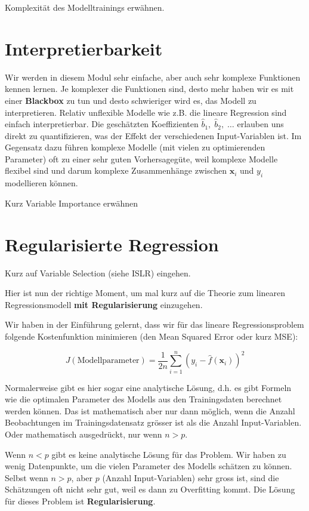 \documentclass[
]{book}
\begin{document}
Komplexität des Modelltrainings erwähnen.

\hypertarget{interpretierbarkeit}{%
\section{Interpretierbarkeit}\label{interpretierbarkeit}}

Wir werden in diesem Modul sehr einfache, aber auch sehr komplexe Funktionen kennen lernen. Je komplexer die Funktionen sind, desto mehr haben wir es mit einer \textbf{Blackbox} zu tun und desto schwieriger wird es, das Modell zu interpretieren. Relativ unflexible Modelle wie z.B. die lineare Regression sind einfach interpretierbar. Die geschätzten Koeffizienten \(\hat{b}_1,\; \hat{b}_2,\; \ldots\) erlauben uns direkt zu quantifizieren, was der Effekt der verschiedenen Input-Variablen ist. Im Gegensatz dazu führen komplexe Modelle (mit vielen zu optimierenden Parameter) oft zu einer sehr guten Vorhersagegüte, weil komplexe Modelle flexibel sind und darum komplexe Zusammenhänge zwischen \(\mathbf{x}_i\) und \(y_i\) modellieren können.

Kurz Variable Importance erwähnen

\hypertarget{regularisierte-regression}{%
\section{Regularisierte Regression}\label{regularisierte-regression}}

Kurz auf Variable Selection (siehe ISLR) eingehen.

Hier ist nun der richtige Moment, um mal kurz auf die Theorie zum linearen Regressionsmodell \textbf{mit Regularisierung} einzugehen.

Wir haben in der Einführung gelernt, dass wir für das lineare Regressionsproblem folgende Kostenfunktion minimieren (den Mean Squared Error oder kurz MSE):

\[
J(\text{Modellparameter}) = \frac{1}{2n} \sum_{i=1}^{n} \left(y_i - \hat{f}(\mathbf{x}_i) \right)^2
\]

Normalerweise gibt es hier sogar eine analytische Lösung, d.h. es gibt Formeln wie die optimalen Parameter des Modells aus den Trainingsdaten berechnet werden können. Das ist mathematisch aber nur dann möglich, wenn die Anzahl Beobachtungen im Trainingsdatensatz grösser ist als die Anzahl Input-Variablen. Oder mathematisch ausgedrückt, nur wenn \(n>p\).

Wenn \(n<p\) gibt es keine analytische Lösung für das Problem. Wir haben zu wenig Datenpunkte, um die vielen Parameter des Modells schätzen zu können. Selbst wenn \(n>p\), aber \(p\) (Anzahl Input-Variablen) sehr gross ist, sind die Schätzungen oft nicht sehr gut, weil es dann zu Overfitting kommt. Die Lösung für dieses Problem ist \textbf{Regularisierung}.
\end{document}
